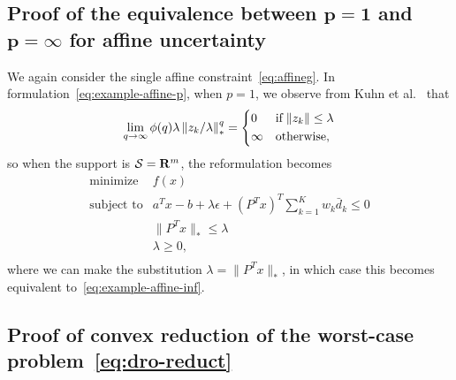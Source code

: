 \documentclass[12pt]{article}
\newcommand{\citep}{\cite}
\theoremstyle{thmstyleone}%
\theoremstyle{thmstyletwo}%
\theoremstyle{thmstylethree}%
\begin{document}
\begin{appendices}
\section{Proof of the equivalence between $\mathbf{p =1}$ and  $\mathbf{p = \infty}$ for affine uncertainty}
\fi
\label{app:equivalence}
We again consider the single affine constraint~\eqref{eq:affineg}. In formulation~\eqref{eq:example-affine-p}, when $p=1$, we observe from Kuhn et al.~\citep[Section 2.2 Remark 1]{kuhn2019wasserstein} that
\begin{equation*}
	 \lim_{q \rightarrow \infty}\phi(q)\lambda \left\|z_{k}/\lambda \right\|^q_* =
	\begin{dcases} 0 & \text{if}\; \|z_{k} \| \leq \lambda \\
		\infty & \text{otherwise},
	\end{dcases}
	\end{equation*}
so when the support is $\mathcal{S} = {\mathbf R}^m$, the reformulation becomes
\begin{equation}
	\begin{array}{ll}
		\mbox{minimize} & f(x)\\
		\mbox{subject to} & a^Tx - b +\lambda \epsilon + (P^Tx)^T\sum_{k=1}^{K} w_k \bar{d}_k \le 0\\
		& \|P^Tx \|_* \leq \lambda \\
		& \lambda \ge 0,\\
	\end{array}
\end{equation}
where we can make the substitution $\lambda = \| P^Tx \|_*$, in which case this becomes equivalent to~\eqref{eq:example-affine-inf}.

\ifpreprint
\subsection{Proof of convex reduction of the worst-case problem~\eqref{eq:dro-reduct}}
\else

\end{appendices}
\end{document}
